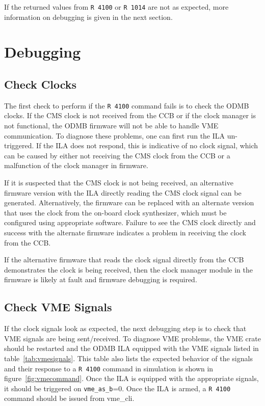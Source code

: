 \documentclass[10pt,a4paper]{article}
\begin{document}
If the returned values from \texttt{R 4100} or \texttt{R 1014} are not as expected, more information on debugging is given in the next section.

\section{Debugging}

\subsection{Check Clocks}

The first check to perform if the \texttt{R 4100} command fails is to check the ODMB clocks. If the CMS clock is not received from the CCB or if the clock manager is not functional, the ODMB firmware will not be able to handle VME communication. To diagnose these problems, one can first run the ILA un-triggered. If the ILA does not respond, this is indicative of no clock signal, which can be caused by either not receiving the CMS clock from the CCB or a malfunction of the clock manager in firmware.

If it is suspected that the CMS clock is not being received, an alternative firmware version with the ILA directly reading the CMS clock signal can be generated. Alternatively, the firmware can be replaced with an alternate version that uses the clock from the on-board clock synthesizer, which must be configured using appropriate software. Failure to see the CMS clock directly and success with the alternate firmware indicates a problem in receiving the clock from the CCB.

If the alternative firmware that reads the clock signal directly from the CCB demonstrates the clock is being received, then the clock manager module in the firmware is likely at fault and firmware debugging is required.

\subsection{Check VME Signals}

If the clock signals look as expected, the next debugging step is to check that VME signals are being sent/received. To diagnose VME problems, the VME crate should be restarted and the ODMB ILA equipped with the VME signals listed in table~\ref{tab:vmesignals}. This table also lists the expected behavior of the signals and their response to a \texttt{R 4100} command in simulation is shown in figure~\ref{fig:vmecommand}. Once the ILA is equipped with the appropriate signals, it should be triggered on \texttt{vme\_as\_b}=0. Once the ILA is armed, a \texttt{R 4100} command should be issued from vme\_cli.
\end{document}
